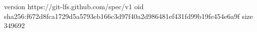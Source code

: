 version https://git-lfs.github.com/spec/v1
oid sha256:f672d8fca1729d5a5793eb166c3d97f40a2d986481ef431fd99b19fe454e6a9f
size 349692
